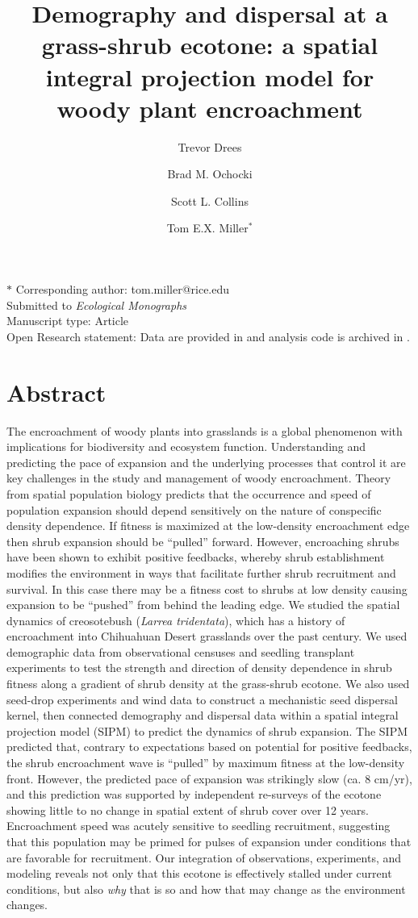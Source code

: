 \documentclass[11pt]{article}\usepackage[]{graphicx}\usepackage[usenames,dvipsnames]{xcolor}
\title{Demography and dispersal at a grass-shrub ecotone: a spatial integral projection model for woody plant encroachment}
\author[a]{Trevor Drees}
\author[b]{Brad M. Ochocki}
\author[c]{Scott L. Collins}
\author[b]{Tom E.X. Miller$^{\ast}$}
\affil[a]{Department of Biology, Penn State University, State College, PA USA}
\affil[b]{Program in Ecology and Evolutionary Biology, Department of BioSciences, Rice University, Houston, TX USA}
\affil[c]{Department of Biology, University of New Mexico, Albuquerque, NM USA}
\begin{document}
\maketitle
\noindent{} $\ast$ Corresponding author: tom.miller@rice.edu\\
\noindent{} Submitted to \textit{Ecological Monographs}\\
\noindent{} Manuscript type: Article\\
\noindent{} Open Research statement: Data are provided in \cite{shrubdata} and analysis code is archived in \cite{projectcode}.

\linenumbers

\newpage
\section*{Abstract}
The encroachment of woody plants into grasslands is a global phenomenon with implications for biodiversity and ecosystem function. 
Understanding and predicting the pace of expansion and the underlying processes that control it are key challenges in the study and management of woody encroachment.
Theory from spatial population biology predicts that the occurrence and speed of population expansion should depend sensitively on the nature of conspecific density dependence.
If fitness is maximized at the low-density encroachment edge then shrub expansion should be ``pulled'' forward.
However, encroaching shrubs have been shown to exhibit positive feedbacks, whereby shrub establishment modifies the environment in ways that facilitate further shrub recruitment and survival. 
In this case there may be a fitness cost to shrubs at low density causing expansion to be ``pushed'' from behind the leading edge.
We studied the spatial dynamics of creosotebush (\textit{Larrea tridentata}), which has a history of encroachment into Chihuahuan Desert grasslands over the past century.
We used demographic data from observational censuses and seedling transplant experiments to test the strength and direction of density dependence in shrub fitness along a gradient of shrub density at the grass-shrub ecotone. 
We also used seed-drop experiments and wind data to construct a mechanistic seed dispersal kernel, then connected demography and dispersal data within a spatial integral projection model (SIPM) to predict the dynamics of shrub expansion.
The SIPM predicted that, contrary to expectations based on potential for positive feedbacks, the shrub encroachment wave is ``pulled'' by maximum fitness at the low-density front.
However, the predicted pace of expansion was strikingly slow (ca. 8 cm/yr), and this prediction was supported by independent re-surveys of the ecotone showing little to no change in spatial extent of shrub cover over 12 years. 
Encroachment speed was acutely sensitive to seedling recruitment, suggesting that this population may be primed for pulses of expansion under conditions that are favorable for recruitment.
Our integration of observations, experiments, and modeling reveals not only that this ecotone is effectively stalled under current conditions, but also \emph{why} that is so and how that may change as the environment changes. 
\end{document}

